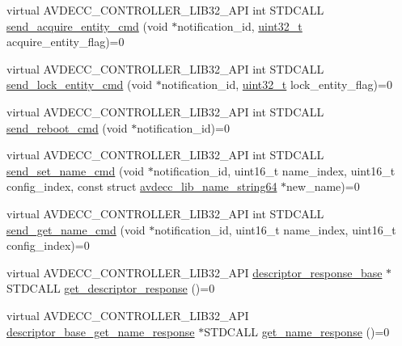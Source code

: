 \begin{DoxyCompactItemize}
\item 
virtual A\+V\+D\+E\+C\+C\+\_\+\+C\+O\+N\+T\+R\+O\+L\+L\+E\+R\+\_\+\+L\+I\+B32\+\_\+\+A\+PI int S\+T\+D\+C\+A\+LL \hyperlink{classavdecc__lib_1_1descriptor__base_adfd0cf2a51bff7d762b0efc743480c48}{send\+\_\+acquire\+\_\+entity\+\_\+cmd} (void $\ast$notification\+\_\+id, \hyperlink{parse_8c_a6eb1e68cc391dd753bc8ce896dbb8315}{uint32\+\_\+t} acquire\+\_\+entity\+\_\+flag)=0
\item 
virtual A\+V\+D\+E\+C\+C\+\_\+\+C\+O\+N\+T\+R\+O\+L\+L\+E\+R\+\_\+\+L\+I\+B32\+\_\+\+A\+PI int S\+T\+D\+C\+A\+LL \hyperlink{classavdecc__lib_1_1descriptor__base_a1ac1f5c700f4eebd37b7c45498b36bbc}{send\+\_\+lock\+\_\+entity\+\_\+cmd} (void $\ast$notification\+\_\+id, \hyperlink{parse_8c_a6eb1e68cc391dd753bc8ce896dbb8315}{uint32\+\_\+t} lock\+\_\+entity\+\_\+flag)=0
\item 
virtual A\+V\+D\+E\+C\+C\+\_\+\+C\+O\+N\+T\+R\+O\+L\+L\+E\+R\+\_\+\+L\+I\+B32\+\_\+\+A\+PI int S\+T\+D\+C\+A\+LL \hyperlink{classavdecc__lib_1_1descriptor__base_a1618412a9b3d57a12044030b31cfd5a3}{send\+\_\+reboot\+\_\+cmd} (void $\ast$notification\+\_\+id)=0
\item 
virtual A\+V\+D\+E\+C\+C\+\_\+\+C\+O\+N\+T\+R\+O\+L\+L\+E\+R\+\_\+\+L\+I\+B32\+\_\+\+A\+PI int S\+T\+D\+C\+A\+LL \hyperlink{classavdecc__lib_1_1descriptor__base_a6a8c227d7a202f251c689107df7ede0b}{send\+\_\+set\+\_\+name\+\_\+cmd} (void $\ast$notification\+\_\+id, uint16\+\_\+t name\+\_\+index, uint16\+\_\+t config\+\_\+index, const struct \hyperlink{structavdecc__lib_1_1avdecc__lib__name__string64}{avdecc\+\_\+lib\+\_\+name\+\_\+string64} $\ast$new\+\_\+name)=0
\item 
virtual A\+V\+D\+E\+C\+C\+\_\+\+C\+O\+N\+T\+R\+O\+L\+L\+E\+R\+\_\+\+L\+I\+B32\+\_\+\+A\+PI int S\+T\+D\+C\+A\+LL \hyperlink{classavdecc__lib_1_1descriptor__base_a27ba9959456de53a8de18eead74806f7}{send\+\_\+get\+\_\+name\+\_\+cmd} (void $\ast$notification\+\_\+id, uint16\+\_\+t name\+\_\+index, uint16\+\_\+t config\+\_\+index)=0
\item 
virtual A\+V\+D\+E\+C\+C\+\_\+\+C\+O\+N\+T\+R\+O\+L\+L\+E\+R\+\_\+\+L\+I\+B32\+\_\+\+A\+PI \hyperlink{classavdecc__lib_1_1descriptor__response__base}{descriptor\+\_\+response\+\_\+base} $\ast$S\+T\+D\+C\+A\+LL \hyperlink{classavdecc__lib_1_1descriptor__base_ac64e6a5ee8781eeb9c781953e845b1be}{get\+\_\+descriptor\+\_\+response} ()=0
\item 
virtual A\+V\+D\+E\+C\+C\+\_\+\+C\+O\+N\+T\+R\+O\+L\+L\+E\+R\+\_\+\+L\+I\+B32\+\_\+\+A\+PI \hyperlink{classavdecc__lib_1_1descriptor__base__get__name__response}{descriptor\+\_\+base\+\_\+get\+\_\+name\+\_\+response} $\ast$S\+T\+D\+C\+A\+LL \hyperlink{classavdecc__lib_1_1descriptor__base_aba4bf8a81f90f5bf00d5c8b5a7330145}{get\+\_\+name\+\_\+response} ()=0
\end{DoxyCompactItemize}


